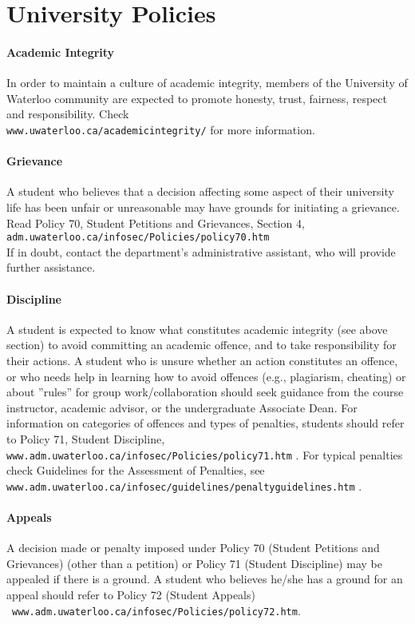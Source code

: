\documentclass[letterpaper,10pt]{article}
\begin{document}
\section*{University Policies}

\paragraph{Academic Integrity}
In order to maintain a culture of academic integrity, members of the University of Waterloo community are expected to promote honesty, trust, fairness, respect and responsibility. Check\\
\texttt{www.uwaterloo.ca/academicintegrity/} for more information.

\paragraph{Grievance}
A student who believes that a decision affecting some aspect of their university life has been unfair or unreasonable may have grounds for initiating a grievance. Read Policy 70, Student Petitions and Grievances, Section 4, \texttt{adm.uwaterloo.ca/infosec/Policies/policy70.htm} \\
If in doubt, contact the department's administrative assistant, who will provide further assistance.

\paragraph{Discipline}
A student is expected to know what constitutes academic integrity (see above section) to avoid committing an academic offence, and to take responsibility for their actions. A student who is unsure whether an action constitutes an offence, or who needs help in learning how to avoid offences (e.g., plagiarism, cheating) or about ''rules'' for group work/collaboration should seek guidance from the course instructor, academic advisor, or the undergraduate Associate Dean. For information on categories of offences and types of penalties, students should refer to Policy 71, Student Discipline, \texttt{www.adm.uwaterloo.ca/infosec/Policies/policy71.htm} . For typical penalties check Guidelines for the Assessment of Penalties, see \\\texttt{www.adm.uwaterloo.ca/infosec/guidelines/penaltyguidelines.htm} .

\paragraph{Appeals}
A decision made or penalty imposed under Policy 70 (Student Petitions and Grievances) (other than a petition) or Policy 71 (Student Discipline) may be appealed if there is a ground. A student who believes he/she has a ground for an appeal should refer to Policy 72 (Student Appeals)\\~\texttt{www.adm.uwaterloo.ca/infosec/Policies/policy72.htm}.
\end{document}
